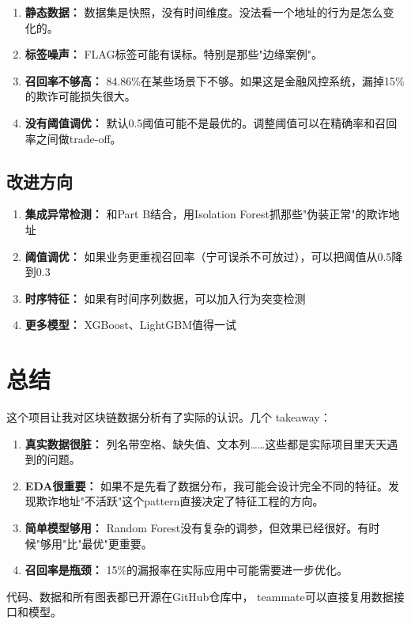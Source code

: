 \documentclass[12pt,a4paper]{article}
\begin{document}
\begin{enumerate}
    \item \textbf{静态数据：} 数据集是快照，没有时间维度。没法看一个地址的行为是怎么变化的。
    \item \textbf{标签噪声：} FLAG标签可能有误标。特别是那些"边缘案例"。
    \item \textbf{召回率不够高：} 84.86\%在某些场景下不够。如果这是金融风控系统，漏掉15\%的欺诈可能损失很大。
    \item \textbf{没有阈值调优：} 默认0.5阈值可能不是最优的。调整阈值可以在精确率和召回率之间做trade-off。
\end{enumerate}

\subsection{改进方向}

\begin{enumerate}
    \item \textbf{集成异常检测：} 和Part B结合，用Isolation Forest抓那些"伪装正常"的欺诈地址
    \item \textbf{阈值调优：} 如果业务更重视召回率（宁可误杀不可放过），可以把阈值从0.5降到0.3
    \item \textbf{时序特征：} 如果有时间序列数据，可以加入行为突变检测
    \item \textbf{更多模型：} XGBoost、LightGBM值得一试
\end{enumerate}

\section{总结}

这个项目让我对区块链数据分析有了实际的认识。几个 takeaway：

\begin{enumerate}
    \item \textbf{真实数据很脏：} 列名带空格、缺失值、文本列……这些都是实际项目里天天遇到的问题。
    \item \textbf{EDA很重要：} 如果不是先看了数据分布，我可能会设计完全不同的特征。发现欺诈地址"不活跃"这个pattern直接决定了特征工程的方向。
    \item \textbf{简单模型够用：} Random Forest没有复杂的调参，但效果已经很好。有时候"够用"比"最优"更重要。
    \item \textbf{召回率是瓶颈：} 15\%的漏报率在实际应用中可能需要进一步优化。
\end{enumerate}

代码、数据和所有图表都已开源在GitHub仓库中， teammate可以直接复用数据接口和模型。
\end{document}
